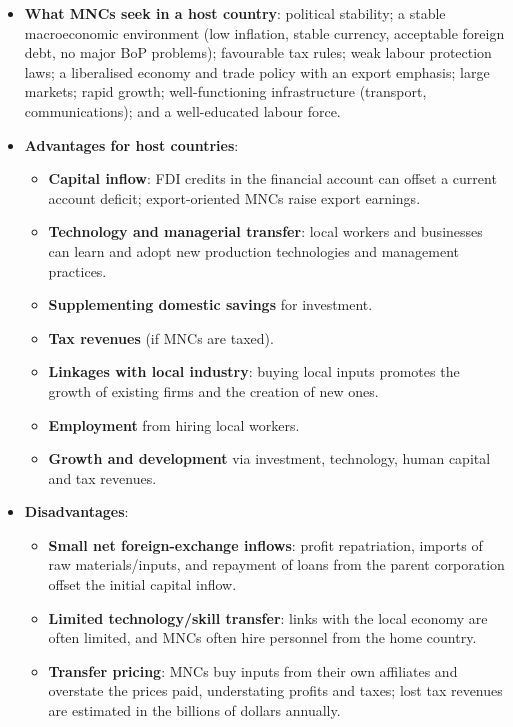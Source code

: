 \begin{itemize}
\begin{itemize}
    \item \textbf{Natural resource extraction} (oil, aluminium, bauxite) in resource-rich developing countries.
  \end{itemize}
  \item \textbf{What MNCs seek in a host country}: political stability; a stable macroeconomic environment (low inflation, stable currency, acceptable foreign debt, no major BoP problems); favourable tax rules; weak labour protection laws; a liberalised economy and trade policy with an export emphasis; large markets; rapid growth; well-functioning infrastructure (transport, communications); and a well-educated labour force.
  \item \textbf{Advantages for host countries}:
  \begin{itemize}
    \item \textbf{Capital inflow}: FDI credits in the financial account can offset a current account deficit; export-oriented MNCs raise export earnings.
    \item \textbf{Technology and managerial transfer}: local workers and businesses can learn and adopt new production technologies and management practices.
    \item \textbf{Supplementing domestic savings} for investment.
    \item \textbf{Tax revenues} (if MNCs are taxed).
    \item \textbf{Linkages with local industry}: buying local inputs promotes the growth of existing firms and the creation of new ones.
    \item \textbf{Employment} from hiring local workers.
    \item \textbf{Growth and development} via investment, technology, human capital and tax revenues.
  \end{itemize}
  \item \textbf{Disadvantages}:
  \begin{itemize}
    \item \textbf{Small net foreign-exchange inflows}: profit repatriation, imports of raw materials/inputs, and repayment of loans from the parent corporation offset the initial capital inflow.
    \item \textbf{Limited technology/skill transfer}: links with the local economy are often limited, and MNCs often hire personnel from the home country.
    \item \textbf{Transfer pricing}: MNCs buy inputs from their own affiliates and overstate the prices paid, understating profits and taxes; lost tax revenues are estimated in the billions of dollars annually.

\end{itemize}
\end{itemize}
